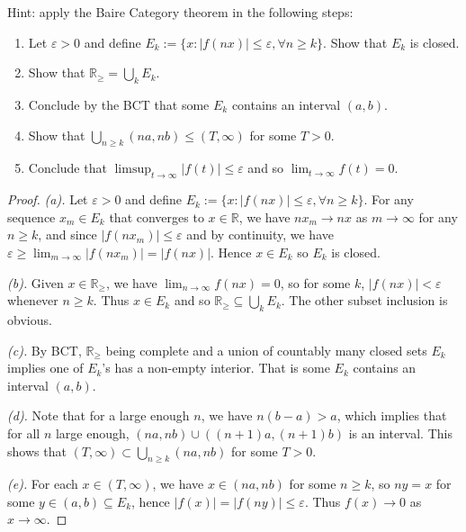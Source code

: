 \documentclass{article}
\newcommand{\R}{\mathbb{R}}
\theoremstyle{definition} %
\numberwithin{thm}{section} %
\theoremstyle{definition} %
\begin{document}
Hint: apply the Baire Category theorem in the following steps:
\begin{enumerate}[label=(\alph*)]
    \item Let $\varepsilon > 0$ and define 
    $E_k := \{x : |f(nx)| \leq \varepsilon, \forall n \geq k\}$. 
    Show that $E_k$ is closed.
    \item Show that $\R_\geq = \bigcup_k E_k$.
    \item Conclude by the BCT that some $E_k$ 
    contains an interval $(a, b)$.
    \item Show that $\bigcup_{n \geq k}(na, nb) \leq (T, \infty)$ 
    for some $T > 0$.
    \item Conclude that $\limsup_{t \to \infty} |f(t)| \leq \varepsilon$ 
    and so $\lim_{t \to \infty} f(t) = 0$.
\end{enumerate}
\begin{proof}
\textit{(a).}
Let $\varepsilon > 0$ and define $E_k := \{x : |f(nx)| 
\leq \varepsilon, \forall n \geq k\}$. For any sequence $x_m \in E_k$
that converges to $x \in \R$, we have $nx_m \to nx$ as $m \to \infty$
for any $n \geq k$, and since $|f(nx_m)| \leq \varepsilon$
and by continuity, we have $\varepsilon \geq 
\lim_{m \to \infty} |f(nx_m)| = |f(nx)|$. Hence $x \in E_k$ so
$E_k$ is closed.

\textit{(b).}
Given $x \in \R_\geq$, we have $\lim_{n \to \infty} f(nx) = 0$, so
for some $k$, $|f(nx)| < \varepsilon$ whenever $n \geq k$.
Thus $x \in E_k$ and so $\R_\geq \subseteq \bigcup_k E_k$. The other
subset inclusion is obvious.

\textit{(c).}
By BCT, $\R_\geq$ being complete and a union of countably many closed
sets $E_k$ implies one of $E_k$'s has a non-empty interior. 
That is some $E_k$ contains an interval $(a, b)$.

\textit{(d).}
Note that for a large enough $n$, we have $n(b - a) > a$, which implies 
that for all $n$ large enough, $(na, nb) \cup ((n + 1)a, (n + 1)b)$ is
an interval. This shows that 
$(T, \infty) \subset \bigcup_{n \geq k} (na, nb)$ for some $T > 0$.

\textit{(e).}
For each $x \in (T, \infty)$, we have $x \in (na, nb)$ for some 
$n \geq k$, so $ny = x$ for some $y \in (a, b) \subseteq E_k$, 
hence $|f(x)| = |f(ny)| \leq \varepsilon$. 
Thus $f(x) \to 0$ as $x \to \infty$.
\end{proof}

\section{}
\end{document}
